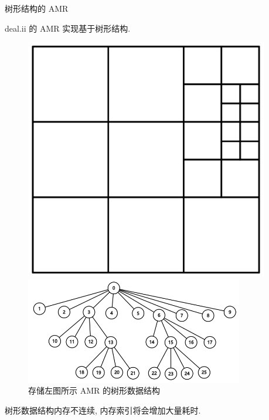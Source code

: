 \documentclass[10pt]{beamer}
\begin{document}
\begin{frame}[fragile]{树形结构的 AMR}
    \footnotesize

    deal.ii 的 AMR 实现基于树形结构.
    \begin{figure}[H]
        \centering
        \begin{minipage}[t]{0.25\textwidth}
            \centering
            \includegraphics[width=0.95\textwidth]{jpg/treeAMR.jpg}
            \caption{\footnotesize 结构化 AMR}
        \end{minipage}
        \hspace{1em}
        \begin{minipage}[t]{0.6\textwidth}
            \centering
            \includegraphics[width=0.85\textwidth]{png/treeStorge.png}
            \caption{\footnotesize 存储左图所示 AMR 的树形数据结构}
        \end{minipage}
    \end{figure}

    \pause
    树形数据结构内存不连续, 内存索引将会增加大量耗时.
\end{frame}
\end{document}
